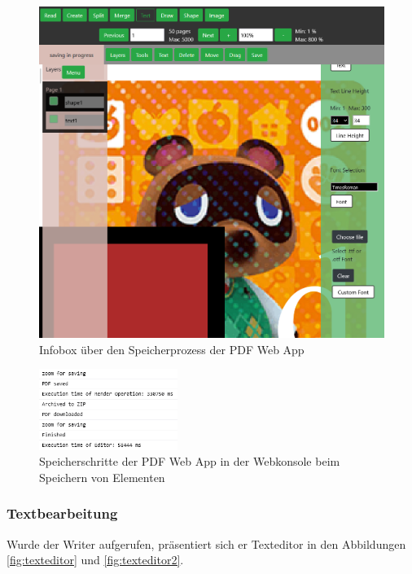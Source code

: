 \begin{figure}[!htbp]
	\centering
	\includegraphics[width=1\textwidth]{"images/save-info.png"}
	\caption{Infobox über den Speicherprozess der PDF Web App}
	\label{fig:save-info}
\end{figure}

\begin{figure}[!htbp]
	\centering
	\includegraphics[width=0.4\textwidth]{"images/save-progress-steps.png"}
	\caption{Speicherschritte der PDF Web App in der Webkonsole beim Speichern von Elementen}
	\label{fig:save-progress-steps}
\end{figure}

\subsubsection{Textbearbeitung}
Wurde der Writer aufgerufen, präsentiert sich er Texteditor in den Abbildungen \ref{fig:texteditor} und \ref{fig:texteditor2}.

